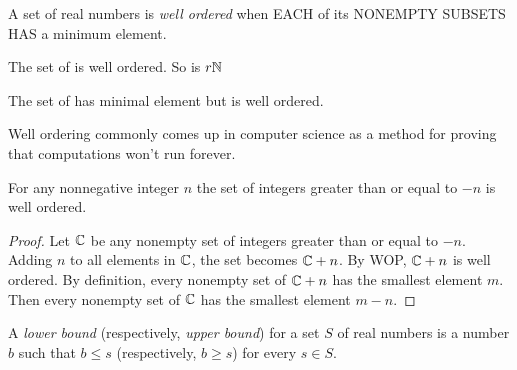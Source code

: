 \begin{definition}
    A set of real numbers is \textit{well ordered} when EACH of its NONEMPTY SUBSETS
    HAS a minimum element.
\end{definition}

\begin{ab}
    The set of  is well ordered. So is $r\mathbb{N}$

    The set of  has minimal element but is 
    well ordered.
\end{ab}

\begin{ab}
    Well ordering commonly comes up in computer science as a method for proving
    that computations won't run forever.
\end{ab}

\begin{claim}
    For any nonnegative integer $n$ the set of integers greater than or
    equal to $-n$ is well ordered.
\end{claim}

\begin{proof}
    Let $\mathbb{C}$ be any nonempty set of integers greater than or equal to $-n$.
    Adding $n$ to all elements in $\mathbb{C}$, the set becomes $\mathbb{C} + n$. By WOP,
    $\mathbb{C} + n$ is well ordered. By definition, every nonempty set of $\mathbb{C} + n$
    has the smallest element $m$. Then every nonempty set of $\mathbb{C}$ has
    the smallest element $m - n$.
\end{proof}

\begin{definition}
    A \textit{lower bound} (respectively, \textit{upper bound}) for a set $S$ of real
    numbers is a number $b$ such that $b \leq s$ (respectively, $b \geq s$) for every $s \in S$.
\end{definition}
